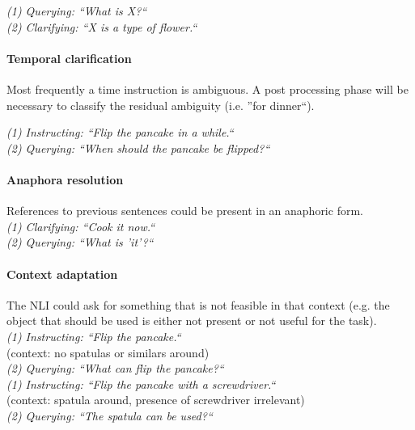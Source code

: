 \documentclass[10pt,a4paper]{article}
\newcommand{\dialog}[3][(1)]{
  \textit{{(#1)} #2: {\color{Bittersweet} ``#3``}}\\}
\begin{document}
\dialog[1]{Querying}{What is X?}
\dialog[2]{Clarifying}{X is a type of flower.}



\paragraph{Temporal clarification}
Most frequently a time instruction is ambiguous. A post processing phase will be necessary to classify the residual ambiguity (i.e. ''for dinner``).

\dialog[1]{Instructing}{Flip the pancake in a while.}
\dialog[2]{Querying}{When should the pancake be flipped?}

\paragraph{Anaphora resolution}
References to previous sentences could be present in an anaphoric form.\\

\dialog[1]{Clarifying}{Cook it now.}
\dialog[2]{Querying}{What is 'it'?}

\paragraph{Context adaptation}
The NLI could ask for something that is not feasible in that context (e.g. the object that should be used is either not present or not useful for the task).\\

\dialog[1]{Instructing}{Flip the pancake.}
{(context: no spatulas or similars around)}\\
\dialog[2]{Querying}{What can flip the pancake?}

\dialog[1]{Instructing}{Flip the pancake with a screwdriver.}
(context: spatula around, presence of screwdriver irrelevant)\\
\dialog[2]{Querying}{The spatula can be used?}
\end{document}
